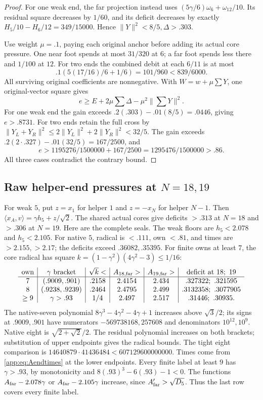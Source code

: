 \documentclass[11pt]{article}
\theoremstyle{definition}
\theoremstyle{remark}
\newcommand{\ip}[2]{\langle #1,#2\rangle}
\newcommand{\norm}[1]{\lVert #1\rVert}
\begin{document}
\begin{proof}
For one weak end, the far projection instead uses
\((5\gamma/6)\omega_6+\omega_{12}/10\).
Its residual square decreases by \(1/60\), and its
deficit decreases by exactly
\(H_5/10-H_6/12=349/15000\).
Hence \(\norm Y^2<8/5,\Delta>.303\).

Use weight \(\mu=.1\), paying each original anchor
before adding its actual core pressure. One near
foot spends at most \(31/320\) at \(6\); a far foot
spends less there and \(1/100\) at \(12\).
For two ends the combined debit at each \(6/11\)
is at most
\[
 .1(5(17/16)/6+1/6)=101/960<839/6000.
\]
All surviving original coefficients are nonnegative.
With \(W=w+\mu\sum Y\), one original-vector square gives
\[
 e\geq E+2\mu\sum\Delta-\mu^2\norm{\sum Y}^2.
\]
For one weak end the gain exceeds
\(.2(.303)-.01(8/5)=.0446\), giving \(e>.8731\).
For two ends retain the full cross by
\(\norm{Y_L+Y_R}^2\leq2\norm{Y_L}^2+2\norm{Y_R}^2<32/5\).
The gain exceeds
\(.2(2\cdot.327)-.01(32/5)=167/2500\),
and
\[
 e>1195276/1500000+167/2500
   =1295476/1500000>.86.
\]
All three cases contradict the contrary bound.
\end{proof}

\subsection[Raw helper-end pressures at N=18,19]{Raw helper-end pressures at \(N=18,19\)}
\label{app:Arawends}
For weak \(5\), put \(z=x_1\) for helper \(1\) and
\(z=-x_N\) for helper \(N-1\). Then
\(\ip{x_A}{v}=\gamma h_5+z/\sqrt2\).
The shared actual cores give deficits
\(>.313\) at \(N=18\) and \(>.306\) at \(N=19\).
Here are the complete seals.
The weak floors are \(h_5<2.078\) and \(h_5<2.105\).
For native \(5\), radical is \(<.111\), own \(<.81\),
and times are \(>2.155,>2.17\); the deficits
exceed \(.36082,.35395\).
For finite owns at least \(7\), the core radical
has square \(k=(1-\gamma^2)(4\gamma^2-3)\leq1/16\):
\[
\begin{array}{c|c|c|c|c|c}
\text{own}&\gamma\text{ bracket}&\sqrt k<&
 A_{18,\rm far}>&A_{19,\rm far}>&
 \text{deficit at }18;\ 19\\ \hline
7&(.9009,.901)&.2158&2.4154&2.434&
 .327322;\ .321595\\
8&(.9238,.9239)&.2464&2.4795&2.499&
 .3132358;\ .3077905\\
\geq9&\gamma>.93&1/4&2.497&2.517&
 .31446;\ .30935.
\end{array}
\]
The native-seven polynomial
\(8\gamma^3-4\gamma^2-4\gamma+1\) increases
above \(\sqrt3/2\); its signs at \(.9009,.901\)
have numerators \(-569738168,257608\) and
denominators \(10^{12},10^9\).
Native eight is \(\sqrt{2+\sqrt2}/2\).
The residual polynomial increases on both brackets;
substitution of upper endpoints gives the radical
bounds. The tight eight comparison is
\(14640879\cdot41436484<607129600000000\).
Times come from \eqref{app:eq:Aendtimes} at the
lower endpoints. Every finite label at least \(9\)
has \(\gamma>.93\), by monotonicity and
\(8(.93)^3-6(.93)-1<0\).
The functions \(A_{\rm far}-2.078\gamma\) or
\(A_{\rm far}-2.105\gamma\) increase, since
\(A_{\rm far}'>\sqrt{D_5}\).
Thus the last row covers every finite label.
\end{document}
